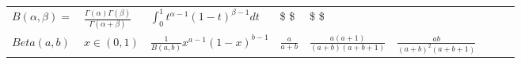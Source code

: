 \documentclass[]{tufte-book}
\begin{document}
\begin{longtable}[]{@{}lllllllll@{}}
\begin{minipage}[t]{0.08\columnwidth}\raggedright
\(B(\alpha,\beta)=\)\strut
\end{minipage} & \begin{minipage}[t]{0.08\columnwidth}\raggedright
\(\frac{\Gamma(\alpha)\Gamma(\beta)}{\Gamma(\alpha+\beta)}\)\strut
\end{minipage} & \begin{minipage}[t]{0.08\columnwidth}\raggedright
\(\int_0^1 t^{\alpha-1}(1-t)^{\beta-1}dt\)\strut
\end{minipage} & \begin{minipage}[t]{0.08\columnwidth}\raggedright
\$ \$\strut
\end{minipage} & \begin{minipage}[t]{0.08\columnwidth}\raggedright
\$ \$\strut
\end{minipage} & \begin{minipage}[t]{0.08\columnwidth}\raggedright
\strut
\end{minipage} & \begin{minipage}[t]{0.08\columnwidth}\raggedright
\strut
\end{minipage} & \begin{minipage}[t]{0.08\columnwidth}\raggedright
\strut
\end{minipage} & \begin{minipage}[t]{0.08\columnwidth}\raggedright
\strut
\end{minipage}\tabularnewline
\begin{minipage}[t]{0.08\columnwidth}\raggedright
\(Beta(a, b)\)\strut
\end{minipage} & \begin{minipage}[t]{0.08\columnwidth}\raggedright
\(x\in(0,1)\)\strut
\end{minipage} & \begin{minipage}[t]{0.08\columnwidth}\raggedright
\(\frac{1}{B(a,b)}x^{a-1}(1-x)^{b-1}\)\strut
\end{minipage} & \begin{minipage}[t]{0.08\columnwidth}\raggedright
\(\frac{a}{a+b}\)\strut
\end{minipage} & \begin{minipage}[t]{0.08\columnwidth}\raggedright
\(\frac{a(a+1)}{(a+b)(a+b+1)}\)\strut
\end{minipage} & \begin{minipage}[t]{0.08\columnwidth}\raggedright
\(\frac{ab}{(a+b)^2(a+b+1)}\)\strut
\end{minipage} & \begin{minipage}[t]{0.08\columnwidth}\raggedright

\end{minipage}
\end{longtable}
\end{document}
